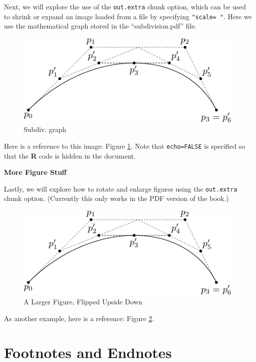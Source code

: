 \documentclass[12pt, twoside]{amherstthesis}
\theoremstyle{definition}
\theoremstyle{definition}
\theoremstyle{definition}
\theoremstyle{remark}
\begin{document}
Next, we will explore the use of the \texttt{out.extra} chunk option, which can be used to shrink or expand an image loaded from a file by specifying \texttt{"scale=\ "}. Here we use the mathematical graph stored in the ``subdivision.pdf'' file.
\begin{figure}

{\centering \includegraphics[scale=0.75]{figures/subdivision} 

}

\caption{Subdiv. graph}\label{fig:subd}
\end{figure}
Here is a reference to this image: Figure \ref{fig:subd}. Note that \texttt{echo=FALSE} is specified so that the \textbf{R} code is hidden in the document.

\textbf{More Figure Stuff}

Lastly, we will explore how to rotate and enlarge figures using the \texttt{out.extra} chunk option. (Currently this only works in the PDF version of the book.)
\begin{figure}

{\centering \includegraphics[angle=180, scale=1.1]{figures/subdivision} 

}

\caption{A Larger Figure, Flipped Upside Down}\label{fig:subd2}
\end{figure}
As another example, here is a reference: Figure \ref{fig:subd2}.

\hypertarget{footnotes-and-endnotes}{%
\section{Footnotes and Endnotes}\label{footnotes-and-endnotes}}
\end{document}
